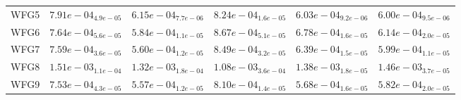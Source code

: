 \documentclass{article}
\begin{document}
\begin{table}
\begin{scriptsize}
\begin{tabular}{llllll}
WFG5 & $  7.91e-04_{ 4.9e-05}$ & $  6.15e-04_{ 7.7e-06}$ & $  8.24e-04_{ 1.6e-05}$ & \cellcolor{gray25}$  6.03e-04_{ 9.2e-06}$ & \cellcolor{gray95}$  6.00e-04_{ 9.5e-06}$ \\
WFG6 & $  7.64e-04_{ 5.6e-05}$ & \cellcolor{gray95}$  5.84e-04_{ 1.1e-05}$ & $  8.67e-04_{ 5.1e-05}$ & $  6.78e-04_{ 1.6e-05}$ & \cellcolor{gray25}$  6.14e-04_{ 2.0e-05}$ \\
WFG7 & $  7.59e-04_{ 3.6e-05}$ & \cellcolor{gray95}$  5.60e-04_{ 1.2e-05}$ & $  8.49e-04_{ 3.2e-05}$ & $  6.39e-04_{ 1.5e-05}$ & \cellcolor{gray25}$  5.99e-04_{ 1.1e-05}$ \\
WFG8 & $  1.51e-03_{ 1.1e-04}$ & \cellcolor{gray25}$  1.32e-03_{ 1.8e-04}$ & \cellcolor{gray95}$  1.08e-03_{ 3.6e-04}$ & $  1.38e-03_{ 1.8e-05}$ & $  1.46e-03_{ 3.7e-05}$ \\
WFG9 & $  7.53e-04_{ 4.3e-05}$ & \cellcolor{gray95}$  5.57e-04_{ 1.2e-05}$ & $  8.10e-04_{ 1.4e-05}$ & \cellcolor{gray25}$  5.68e-04_{ 1.6e-05}$ & $  5.82e-04_{ 2.0e-05}$ \\
\hline
\end{tabular}
\end{scriptsize}
\end{table}
\end{document}

